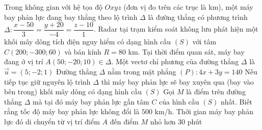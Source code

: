 \begin{ex}%
	Trong không gian với hệ tọa độ $Oxyz$ (đơn vị đo trên các trục là km), một máy bay phản lực đang bay thẳng theo lộ trình $\Delta$ là đường thẳng có phương trình $\Delta \colon \dfrac{x-50}{3} = \dfrac{y+20}{-4} = \dfrac{z-10}{1}$. Radar tại trạm kiểm soát không lưu phát hiện một khối mây dông tích điện nguy hiểm có dạng hình cầu $(S)$ với tâm $C(200;-300;60)$ và bán kính $R=80$ km. Tại thời điểm quan sát, máy bay đang ở vị trí $A(50;-20;10) \in \Delta$.
	\choiceTF
	{Một vectơ chỉ phương của đường thẳng $\Delta$ là $\vec{u}=(5;-2;1)$}
	{\True Đường thẳng $\Delta$ nằm trong mặt phẳng $(P) \colon 4x+3y=140$}
	{\True Nếu tiếp tục giữ nguyên lộ trình $\Delta$ thì máy bay phản lực sẽ bay xuyên qua (bay vào bên trong) khối mây dông có dạng hình cầu $(S)$}
	{\True Gọi $M$ là điểm trên đường thẳng $\Delta$ mà tại đó máy bay phản lực gần tâm $C$ của hình cầu $(S)$ nhất. Biết rằng tốc độ máy bay phản lực không đổi là $500$ km/h. Thời gian máy bay phản lực đó di chuyển từ vị trí điểm $A$ đến điểm $M$ nhỏ hơn $30$ phút}
\end{ex}
